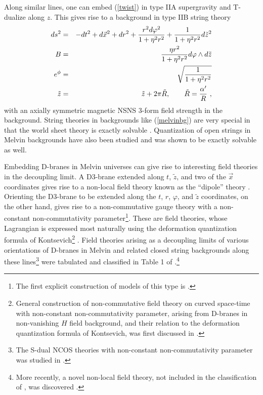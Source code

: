\documentclass[12pt]{article}
\newcommand{\beq}{\begin{eqnarray}}
\newcommand{\eeq}{\end{eqnarray}}
\begin{document}
Along similar lines, one can embed (\ref{twist}) in type IIA
supergravity and T-dualize along $z$. This gives rise to a background
in type IIB string theory
%
\beq ds^2 & = & -dt^2 + d \vec x^2 + dr^2 + {r^2 d \varphi^2 \over 1 + \eta^2 r^2} + {1 \over 1 + \eta^2 r^2} d\tilde z^2 \cr
B & = & {\eta r^2 \over 1 + \eta^2 r^2} d \varphi \wedge d \tilde z \cr
e^{\phi} & = & \sqrt{1 \over 1 + \eta^2 r^2} \cr
\tilde z &=& \tilde z + 2 \pi \tilde R, \qquad \tilde R  = {\alpha' \over R} \ ,  \label{melvinbg}
\eeq
%
with an axially symmetric magnetic NSNS 3-form field strength in the
background. String theories in backgrounds like (\ref{melvinbg}) are
very special in that the world sheet theory is exactly solvable
\cite{Russo:1994cv,Tseytlin:1994ei,Russo:1995tj,Tseytlin:1995fh,Russo:1995aj,Russo:1995ik}. Quantization
of open strings in Melvin backgrounds have also been studied and was
shown to be exactly solvable \cite{Dudas:2001ux,Takayanagi:2001aj} as
well.

Embedding D-branes in Melvin universes can give rise to interesting
field theories in the decoupling limit. A D3-brane extended along $t$,
$\tilde z$, and two of the $\vec x$ coordinates gives rise to a
non-local field theory known as the ``dipole'' theory
\cite{Bergman:2000cw,Bergman:2001rw}. Orienting the D3-brane to be
extended along the $t$, $r$, $\varphi$, and $\tilde z$ coordinates, on
the other hand, gives rise to a non-commutative gauge theory with a
non-constant non-commutativity parameter\footnote{The first explicit
construction of models of this type is
\cite{Hashimoto:2002nr}.}\cite{Hashimoto:2004pb,Hashimoto:2005hy}. These
are field theories, whose Lagrangian \cite{Hashimoto:2005hy} is
expressed most naturally using the deformation quantization formula of
Kontsevich\footnote{General construction of non-commutative field
theory on curved space-time with non-constant non-commutativity
parameter, arising from D-branes in non-vanishing $H$ field
background, and their relation to the deformation quantization formula
of Kontsevich, was first discussed in \cite{Cornalba:2001sm}.}
\cite{Kontsevich:1997vb}. Field theories arising as a decoupling
limits of various orientations of D-branes in Melvin and related
closed string backgrounds along these lines\footnote{The S-dual NCOS theories with non-constant non-commutativity parameter was studied in  \cite{Cai:2002sv,Cai:2006tda}.}  were tabulated and
classified in Table 1 of \cite{Hashimoto:2004pb}.\footnote{More
recently, a novel non-local field theory, not included in the
classification of \cite{Hashimoto:2004pb}, was discovered
\cite{Ganor:2006ub,Ganor:2007qh}.}
\end{document}
